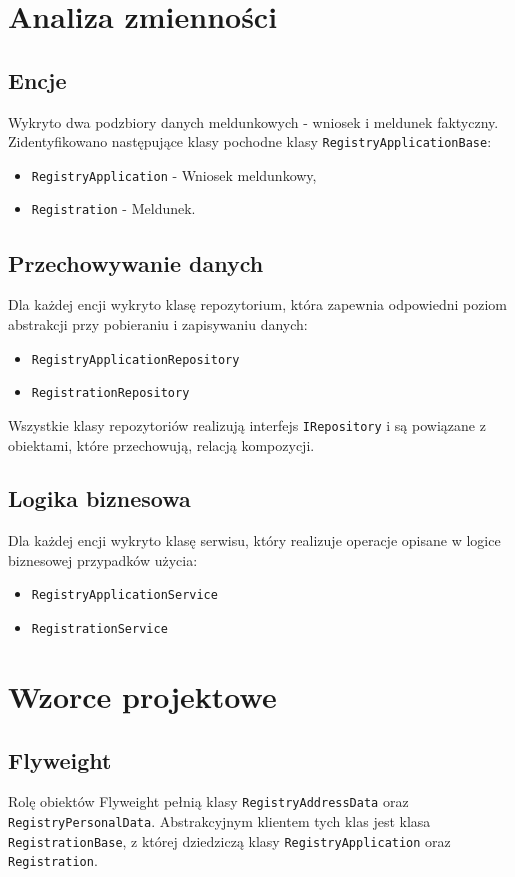 \documentclass[12pt]{article}
\begin{document}
\newpage

\section{Analiza zmienności}
\subsection{Encje}
Wykryto dwa podzbiory danych meldunkowych - wniosek i meldunek faktyczny.
Zidentyfikowano następujące klasy pochodne klasy \lstinline{RegistryApplicationBase}: 
\begin{itemize}[noitemsep]
    \item \lstinline{RegistryApplication} - Wniosek meldunkowy,
    \item \lstinline{Registration} - Meldunek.
\end{itemize}

\subsection{Przechowywanie danych}
Dla każdej encji wykryto klasę repozytorium, która zapewnia odpowiedni poziom abstrakcji przy pobieraniu i zapisywaniu danych:
\begin{itemize}[noitemsep]
    \item \lstinline{RegistryApplicationRepository}
    \item \lstinline{RegistrationRepository}
\end{itemize}
Wszystkie klasy repozytoriów realizują interfejs \lstinline{IRepository} i są powiązane z obiektami, które przechowują, relacją kompozycji.

\subsection{Logika biznesowa}
Dla każdej encji wykryto klasę serwisu, który realizuje operacje opisane w logice biznesowej przypadków użycia:
\begin{itemize}[noitemsep]
    \item \lstinline{RegistryApplicationService}
    \item \lstinline{RegistrationService}
\end{itemize}


\section{Wzorce projektowe}
\subsection{Flyweight}
Rolę obiektów Flyweight pełnią klasy \lstinline{RegistryAddressData} oraz \lstinline{RegistryPersonalData}. Abstrakcyjnym klientem tych klas jest klasa \lstinline{RegistrationBase}, z której dziedziczą klasy \lstinline{RegistryApplication} oraz \lstinline{Registration}.
\end{document}
